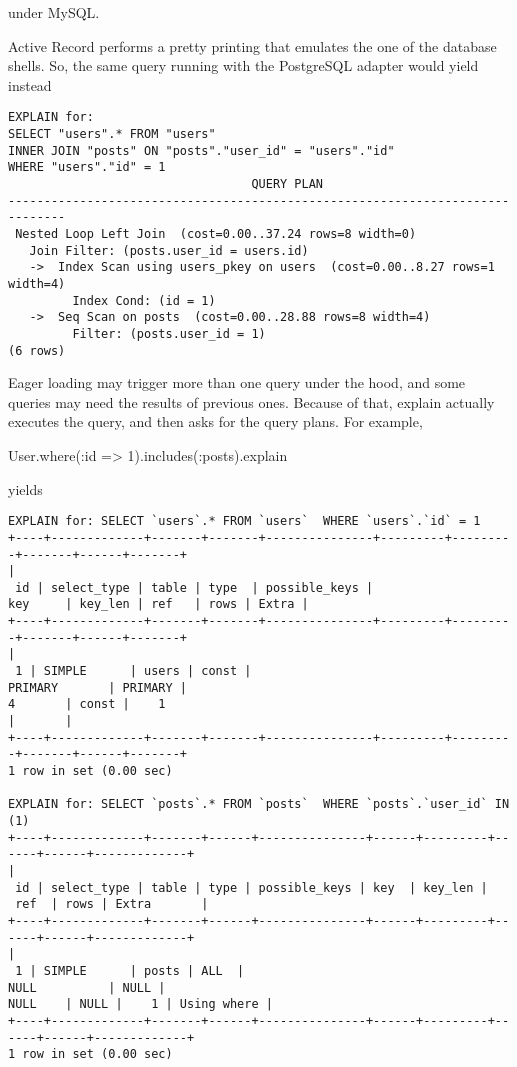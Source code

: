\documentclass[10pt]{book}
\newenvironment{code}{%
  \scriptsize
    \verbatim
}{%
    \endverbatim
    \newline
}
\begin{document}
under MySQL.


Active Record performs a pretty printing that emulates the one of the database shells. So, the same query running with the PostgreSQL adapter would yield instead
{\tiny
\begin{verbatim}
EXPLAIN for: 
SELECT "users".* FROM "users" 
INNER JOIN "posts" ON "posts"."user_id" = "users"."id" 
WHERE "users"."id" = 1
                                  QUERY PLAN
------------------------------------------------------------------------------
 Nested Loop Left Join  (cost=0.00..37.24 rows=8 width=0)
   Join Filter: (posts.user_id = users.id)
   ->  Index Scan using users_pkey on users  (cost=0.00..8.27 rows=1 width=4)
         Index Cond: (id = 1)
   ->  Seq Scan on posts  (cost=0.00..28.88 rows=8 width=4)
         Filter: (posts.user_id = 1)
(6 rows)
\end{verbatim}
}

Eager loading may trigger more than one query under the hood, and some queries may need the results of previous ones. Because of that, explain actually executes the query, and then asks for the query plans. For example,
\begin{code}
User.where(:id => 1).includes(:posts).explain
\end{code}

yields
{\tiny
\begin{verbatim}
EXPLAIN for: SELECT `users`.* FROM `users`  WHERE `users`.`id` = 1
+----+-------------+-------+-------+---------------+---------+---------+-------+------+-------+
|
 id | select_type | table | type  | possible_keys | 
key     | key_len | ref   | rows | Extra |
+----+-------------+-------+-------+---------------+---------+---------+-------+------+-------+
| 
 1 | SIMPLE      | users | const | 
PRIMARY       | PRIMARY | 
4       | const |    1 
|       |
+----+-------------+-------+-------+---------------+---------+---------+-------+------+-------+
1 row in set (0.00 sec)
 
EXPLAIN for: SELECT `posts`.* FROM `posts`  WHERE `posts`.`user_id` IN (1)
+----+-------------+-------+------+---------------+------+---------+------+------+-------------+
|
 id | select_type | table | type | possible_keys | key  | key_len |
 ref  | rows | Extra       |
+----+-------------+-------+------+---------------+------+---------+------+------+-------------+
| 
 1 | SIMPLE      | posts | ALL  | 
NULL          | NULL | 
NULL    | NULL |    1 | Using where |
+----+-------------+-------+------+---------------+------+---------+------+------+-------------+
1 row in set (0.00 sec)
\end{verbatim}
}
\end{document}

